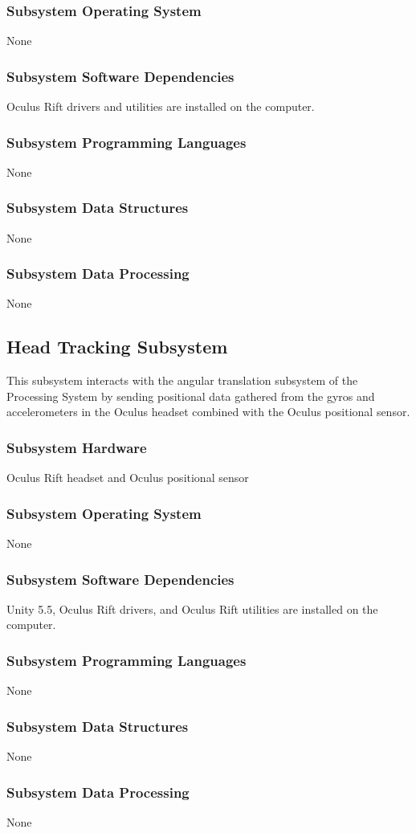 \subsubsection{Subsystem Operating System}
None

\subsubsection{Subsystem Software Dependencies}
Oculus Rift drivers and utilities are installed on the computer.

\subsubsection{Subsystem Programming Languages}
None

\subsubsection{Subsystem Data Structures}
None

\subsubsection{Subsystem Data Processing}
None

\subsection{Head Tracking Subsystem}
This subsystem interacts with the angular translation subsystem of the Processing System by sending positional data gathered from the gyros and accelerometers in the Oculus headset combined with the Oculus positional sensor.

\subsubsection{Subsystem Hardware}
Oculus Rift headset and Oculus positional sensor

\subsubsection{Subsystem Operating System}
None

\subsubsection{Subsystem Software Dependencies}
Unity 5.5, Oculus Rift drivers, and Oculus Rift utilities are installed on the computer.

\subsubsection{Subsystem Programming Languages}
None

\subsubsection{Subsystem Data Structures}
None

\subsubsection{Subsystem Data Processing}
None